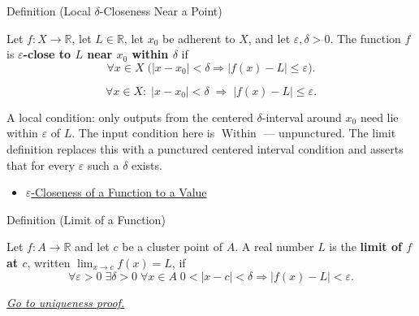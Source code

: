 \begin{definitionbox}{Definition (Local $\delta$-Closeness Near a Point)}
\begin{definition}
\label{def:delta-close-function}
Let $f : X \to \mathbb{R}$, let $L \in \mathbb{R}$, let $x_0$ be
adherent to $X$, and let $\varepsilon, \delta > 0$. The function $f$
is \textbf{$\varepsilon$-close to $L$ near $x_0$ within $\delta$} if
\[
  \forall x \in X\;\bigl(|x-x_0|<\delta\Rightarrow |f(x)-L|\leq\varepsilon\bigr).
\]
\end{definition}
\end{definitionbox}

\begin{remark*}
\[
  \forall x \in X :\;
  |x - x_0| < \delta \;\Rightarrow\; |f(x) - L| \leq \varepsilon.
\]
\end{remark*}

\begin{remark*}[Interpretation]
A local condition: only outputs from the centered $\delta$-interval around $x_0$
need lie within $\varepsilon$ of $L$. The input condition here is
$\operatorname{Within}$ --- unpunctured. The limit definition replaces
this with a punctured centered interval condition and asserts
that for every $\varepsilon$ such a $\delta$ exists.
\end{remark*}

\begin{dependencies}
\begin{itemize}
  \item \hyperref[def:eps-close-function]{$\varepsilon$-Closeness of a Function to a Value}
\end{itemize}
\end{dependencies}


\begin{definitionbox}{Definition (Limit of a Function)}
\begin{definition}
\label{def:limit-function}
Let $f : A \to \mathbb{R}$ and let $c$ be a cluster point of $A$.
A real number $L$ is the \textbf{limit of $f$ at $c$}, written
$\lim_{x \to c} f(x) = L$, if
\[
  \forall\varepsilon>0\;\exists\delta>0\;\forall x\in A\;
  0<|x-c|<\delta\Rightarrow |f(x)-L|<\varepsilon.
\]

\smallskip\noindent
\hyperref[prf:limit-unique]{\textit{Go to uniqueness proof.}}
\end{definition}
\end{definitionbox}

